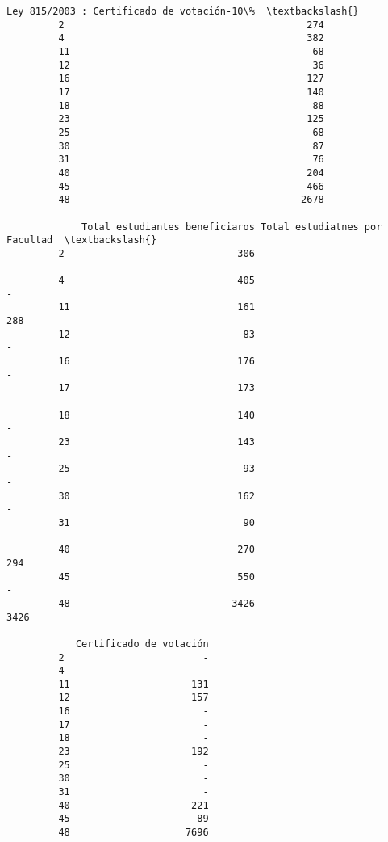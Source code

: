 \documentclass[11pt]{article}
\begin{document}
\begin{Verbatim}[commandchars=\\\{\}]
             Ley 815/2003 : Certificado de votación-10\%  \textbackslash{}
         2                                          274   
         4                                          382   
         11                                          68   
         12                                          36   
         16                                         127   
         17                                         140   
         18                                          88   
         23                                         125   
         25                                          68   
         30                                          87   
         31                                          76   
         40                                         204   
         45                                         466   
         48                                        2678   
         
             Total estudiantes beneficiaros Total estudiatnes por Facultad  \textbackslash{}
         2                              306                              -   
         4                              405                              -   
         11                             161                            288   
         12                              83                              -   
         16                             176                              -   
         17                             173                              -   
         18                             140                              -   
         23                             143                              -   
         25                              93                              -   
         30                             162                              -   
         31                              90                              -   
         40                             270                            294   
         45                             550                              -   
         48                            3426                           3426   
         
            Certificado de votación  
         2                        -  
         4                        -  
         11                     131  
         12                     157  
         16                       -  
         17                       -  
         18                       -  
         23                     192  
         25                       -  
         30                       -  
         31                       -  
         40                     221  
         45                      89  
         48                    7696  
\end{Verbatim}
            
\end{document}
